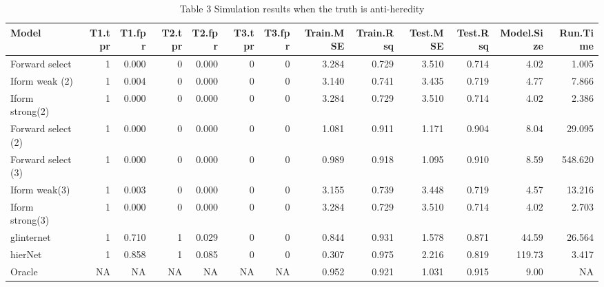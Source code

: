 \documentclass[11pt,]{book}
\theoremstyle{definition}
\theoremstyle{definition}
\theoremstyle{remark}
\begin{document}
\begin{table}

\caption{\label{tab:Chap3sim3}Table 3 Simulation results when the truth is anti-heredity}
\centering
\begin{tabular}[t]{lrrrrrrrrrrrr}
\toprule
Model & T1.tpr & T1.fpr & T2.tpr & T2.fpr & T3.tpr & T3.fpr & Train.MSE & Train.Rsq & Test.MSE & Test.Rsq & Model.Size & Run.Time\\
\midrule
Forward select & 1 & 0.000 & 0 & 0.000 & 0 & 0 & 3.284 & 0.729 & 3.510 & 0.714 & 4.02 & 1.005\\
Iform weak (2) & 1 & 0.004 & 0 & 0.000 & 0 & 0 & 3.140 & 0.741 & 3.435 & 0.719 & 4.77 & 7.866\\
Iform strong(2) & 1 & 0.000 & 0 & 0.000 & 0 & 0 & 3.284 & 0.729 & 3.510 & 0.714 & 4.02 & 2.386\\
Forward select (2) & 1 & 0.000 & 0 & 0.000 & 0 & 0 & 1.081 & 0.911 & 1.171 & 0.904 & 8.04 & 29.095\\
Forward select (3) & 1 & 0.000 & 0 & 0.000 & 0 & 0 & 0.989 & 0.918 & 1.095 & 0.910 & 8.59 & 548.620\\
\addlinespace
Iform weak(3) & 1 & 0.003 & 0 & 0.000 & 0 & 0 & 3.155 & 0.739 & 3.448 & 0.719 & 4.57 & 13.216\\
Iform strong(3) & 1 & 0.000 & 0 & 0.000 & 0 & 0 & 3.284 & 0.729 & 3.510 & 0.714 & 4.02 & 2.703\\
glinternet & 1 & 0.710 & 1 & 0.029 & 0 & 0 & 0.844 & 0.931 & 1.578 & 0.871 & 44.59 & 26.564\\
hierNet & 1 & 0.858 & 1 & 0.085 & 0 & 0 & 0.307 & 0.975 & 2.216 & 0.819 & 119.73 & 3.417\\
Oracle & NA & NA & NA & NA & NA & NA & 0.952 & 0.921 & 1.031 & 0.915 & 9.00 & NA\\
\bottomrule
\end{tabular}
\end{table}
\end{document}
